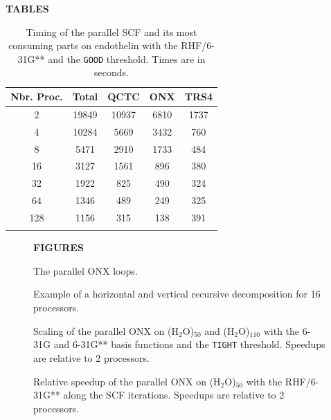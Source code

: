 \documentclass[prl,preprint,doublespace]{revtex4} %
\newcommand{\commentoutB}[1]{#1}
\begin{document}
\commentoutB{


\clearpage

\begin{center}
\bf  TABLES\\[1.cm]
\end{center}

\begin{table}[h]
  \centering
  \caption{\protect
    Timing of the parallel SCF and its most consuming parts
    on endothelin with the RHF/6-31G** and the {\tt GOOD} threshold.
    Times are in seconds.
  }\label{Tab:EndothelinTotalTiming}
  \begin{tabular}{ccccc}
    \toprule
    Nbr. Proc. & Total & QCTC & ONX & TRS4 \\
  \hline
    2 & 19849 & 10937 & 6810 & 1737 \\
    4 & 10284 &  5669 & 3432 &  760 \\
    8 &  5471 &  2910 & 1733 &  484 \\
   16 &  3127 &  1561 &  896 &  380 \\
   32 &  1922 &   825 &  490 &  324 \\
   64 &  1346 &   489 &  249 &  325 \\
  128 &  1156 &   315 &  138 &  391 \\
  \botrule
  \end{tabular}
\end{table}

\clearpage

\begin{figure}[h]
\begin{center}
\bf  FIGURES\\[1.cm]
\end{center}

  \caption{\protect
    Parallel ordering of significant distributions.
  }\label{Fig:List}

  \caption{\protect
    The parallel ONX loops.
  }\label{Fig:ONXcore}

 \caption{\protect
   Example of a horizontal and vertical recursive decomposition for 16 processors.
 }\label{fig:part2D}

  \caption{\protect
    Scaling of the parallel ONX on (H$_2$O)$_{50}$
    and (H$_2$O)$_{110}$ with the 6-31G and 6-31G**
    basis functions and the {\tt TIGHT} threshold.
    Speedups are relative to 2 processors.
  }\label{fig:h2o_50_110}

  \caption{\protect
    Relative speedup of the parallel ONX on (H$_2$O)$_{50}$ with the RHF/6-31G**
    along the SCF iterations.
    Speedups are relative to 2 processors.
  }\label{fig:h2o_50_prop}


\end{figure}}
\end{document}

